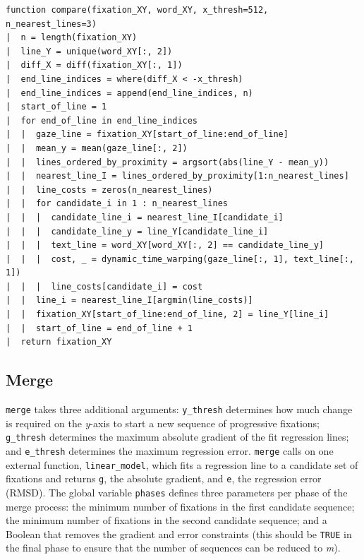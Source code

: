 \documentclass[doc,biblatex]{apa7}
\begin{document}
\begin{verbatim}
function compare(fixation_XY, word_XY, x_thresh=512,  n_nearest_lines=3)
|  n = length(fixation_XY)
|  line_Y = unique(word_XY[:, 2])
|  diff_X = diff(fixation_XY[:, 1])
|  end_line_indices = where(diff_X < -x_thresh)
|  end_line_indices = append(end_line_indices, n)
|  start_of_line = 1
|  for end_of_line in end_line_indices
|  |  gaze_line = fixation_XY[start_of_line:end_of_line]
|  |  mean_y = mean(gaze_line[:, 2])
|  |  lines_ordered_by_proximity = argsort(abs(line_Y - mean_y))
|  |  nearest_line_I = lines_ordered_by_proximity[1:n_nearest_lines]
|  |  line_costs = zeros(n_nearest_lines)
|  |  for candidate_i in 1 : n_nearest_lines
|  |  |  candidate_line_i = nearest_line_I[candidate_i]
|  |  |  candidate_line_y = line_Y[candidate_line_i]
|  |  |  text_line = word_XY[word_XY[:, 2] == candidate_line_y]
|  |  |  cost, _ = dynamic_time_warping(gaze_line[:, 1], text_line[:, 1])
|  |  |  line_costs[candidate_i] = cost
|  |  line_i = nearest_line_I[argmin(line_costs)]
|  |  fixation_XY[start_of_line:end_of_line, 2] = line_Y[line_i]
|  |  start_of_line = end_of_line + 1
|  return fixation_XY
\end{verbatim}

\subsection{Merge}

\texttt{merge} takes three additional arguments: \texttt{y\_thresh} determines how much change is required on the \textit{y}-axis to start a new sequence of progressive fixations; \texttt{g\_thresh} determines the maximum absolute gradient of the fit regression lines; and \texttt{e\_thresh} determines the maximum regression error. \texttt{merge} calls on one external function, \texttt{linear\_model}, which fits a regression line to a candidate set of fixations and returns \texttt{g}, the absolute gradient, and \texttt{e}, the regression error (RMSD). The global variable \texttt{phases} defines three parameters per phase of the merge process: the minimum number of fixations in the first candidate sequence; the minimum number of fixations in the second candidate sequence; and a Boolean that removes the gradient and error constraints (this should be \texttt{TRUE} in the final phase to ensure that the number of sequences can be reduced to \textit{m}).
\end{document}
